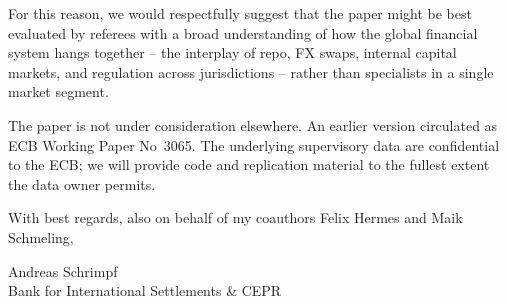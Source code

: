 \documentclass[11pt,a4paper]{article}
\begin{document}
For this reason, we would respectfully suggest that the paper might be best evaluated by referees with a broad understanding of how the global financial system hangs together -- the interplay of repo, FX swaps, internal capital markets, and regulation across jurisdictions -- rather than specialists in a single market segment.

The paper is not under consideration elsewhere. An earlier version circulated as ECB Working Paper No~3065. The underlying supervisory data are confidential to the ECB; we will provide code and replication material to the fullest extent the data owner permits.

\vspace{0.2em}

With best regards, also on behalf of my coauthors Felix Hermes and Maik Schmeling,

\vspace{1.2em}

Andreas Schrimpf\\
Bank for International Settlements \& CEPR
\end{document}
